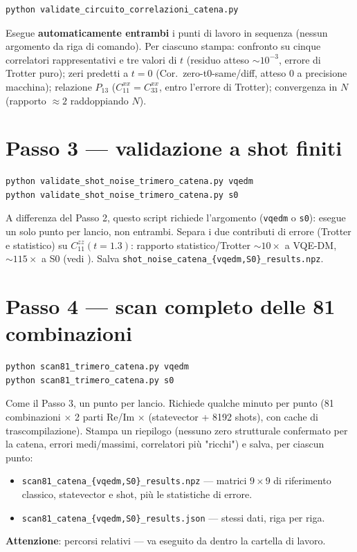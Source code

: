 \documentclass[11pt,a4paper]{article}
\begin{document}
\begin{verbatim}
python validate_circuito_correlazioni_catena.py
\end{verbatim}
Esegue \textbf{automaticamente entrambi} i punti di lavoro in sequenza (nessun argomento da
riga di comando). Per ciascuno stampa: confronto su cinque correlatori rappresentativi e tre
valori di $t$ (residuo atteso $\sim10^{-3}$, errore di Trotter puro); zeri predetti a $t=0$
(Cor.\ zero-t0-same/diff, atteso $0$ a precisione macchina); relazione $P_{13}$
($C_{11}^{xx}=C_{33}^{xx}$, entro l'errore di Trotter); convergenza in $N$ (rapporto $\approx2$
raddoppiando $N$).

\section*{Passo 3 --- validazione a shot finiti}

\begin{verbatim}
python validate_shot_noise_trimero_catena.py vqedm
python validate_shot_noise_trimero_catena.py s0
\end{verbatim}
A differenza del Passo 2, questo script richiede l'argomento (\texttt{vqedm} o \texttt{s0}):
esegue un solo punto per lancio, non entrambi. Separa i due contributi di errore (Trotter e
statistico) su $C_{11}^{zz}(t{=}1.3)$: rapporto statistico/Trotter $\sim10\times$ a VQE-DM,
$\sim115\times$ a S0 (vedi
\texttt{}). Salva
\texttt{shot\_noise\_catena\_\{vqedm,S0\}\_results.npz}.

\section*{Passo 4 --- scan completo delle 81 combinazioni}

\begin{verbatim}
python scan81_trimero_catena.py vqedm
python scan81_trimero_catena.py s0
\end{verbatim}
Come il Passo 3, un punto per lancio. Richiede qualche minuto per punto (81 combinazioni
$\times$ 2 parti Re/Im $\times$ (statevector + 8192 shots), con cache di trascompilazione).
Stampa un riepilogo (nessuno zero strutturale confermato per la catena, errori medi/massimi,
correlatori più "ricchi") e salva, per ciascun punto:
\begin{itemize}
\item \texttt{scan81\_catena\_\{vqedm,S0\}\_results.npz} --- matrici $9\times9$ di riferimento
classico, statevector e shot, più le statistiche di errore.
\item \texttt{scan81\_catena\_\{vqedm,S0\}\_results.json} --- stessi dati, riga per riga.
\end{itemize}
\textbf{Attenzione}: percorsi relativi --- va eseguito da dentro la cartella di lavoro.
\end{document}
